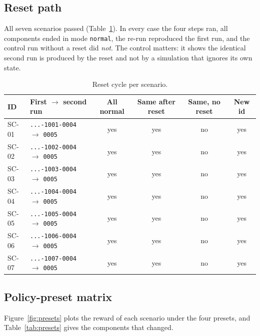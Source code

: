 \documentclass[11pt]{article}
\newcommand{\code}[1]{\texttt{\small #1}}
\begin{document}
\subsection{Reset path}
All seven scenarios passed (Table~\ref{tab:reset}). In every case the four steps
ran, all components ended in mode \code{normal}, the re-run reproduced the first
run, and the control run without a reset did \emph{not}. The control matters: it
shows the identical second run is produced by the reset and not by a simulation
that ignores its own state.

\begin{table}[h]
\centering
\caption{Reset cycle per scenario.}
\label{tab:reset}
\small
\begin{tabular}{l l c c c c}
\toprule
\textbf{ID} & \textbf{First $\to$ second run} & \textbf{All normal} & \textbf{Same after reset} & \textbf{Same, no reset} & \textbf{New id}\\
\midrule
SC-01 & \code{...-1001-0004} $\to$ \code{0005} & yes & yes & no & yes\\
SC-02 & \code{...-1002-0004} $\to$ \code{0005} & yes & yes & no & yes\\
SC-03 & \code{...-1003-0004} $\to$ \code{0005} & yes & yes & no & yes\\
SC-04 & \code{...-1004-0004} $\to$ \code{0005} & yes & yes & no & yes\\
SC-05 & \code{...-1005-0004} $\to$ \code{0005} & yes & yes & no & yes\\
SC-06 & \code{...-1006-0004} $\to$ \code{0005} & yes & yes & no & yes\\
SC-07 & \code{...-1007-0004} $\to$ \code{0005} & yes & yes & no & yes\\
\bottomrule
\end{tabular}
\end{table}

\subsection{Policy-preset matrix}
\label{sec:levers}
Figure~\ref{fig:presets} plots the reward of each scenario under the four presets,
and Table~\ref{tab:presets} gives the components that changed.
\end{document}
